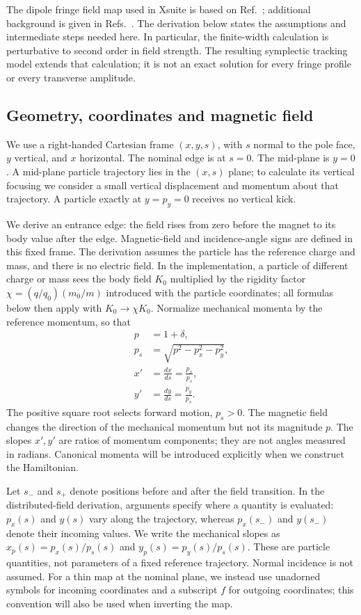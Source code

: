 The dipole fringe field map used in Xsuite is based on
Ref.~\cite{forest-fringe-1}; additional background is given in
Refs.~\cite{silke_cap, silke_fringe}. The derivation below states the
assumptions and intermediate steps needed here. In particular, the
finite-width calculation is perturbative to second order in field strength.
The resulting symplectic tracking model extends that calculation; it is not
an exact solution for every fringe profile or every transverse amplitude.

\subsection{Geometry, coordinates and magnetic field}

We use a right-handed Cartesian frame $(x,y,s)$, with $s$ normal to the pole
face, $y$ vertical, and $x$ horizontal. The nominal edge is at $s=0$.
The mid-plane is $y=0$. A mid-plane particle trajectory lies in the
$(x,s)$ plane; to calculate its vertical focusing we consider a small
vertical displacement and momentum about that trajectory. A particle exactly
at $y=p_y=0$ receives no vertical kick.

We derive an entrance edge: the field rises from zero before the magnet
to its body value after the edge. Magnetic-field and incidence-angle signs
are defined in this fixed frame. The derivation assumes the particle has
the reference charge and mass, and there is no electric field. In the
implementation, a particle of different charge or mass sees the body field
$K_0$ multiplied by the rigidity factor $\chi=(q/q_0)(m_0/m)$ introduced
with the particle coordinates; all formulas below then apply with
$K_0\to\chi K_0$. Normalize mechanical
momenta by the reference momentum, so that
\begin{align}
 p&=1+\delta,\label{eq:fringe_coordinates}\\
 p_s&=\sqrt{p^2-p_x^2-p_y^2},\\
 x'&=\frac{dx}{ds}=\frac{p_x}{p_s},\\
 y'&=\frac{dy}{ds}=\frac{p_y}{p_s}.
\end{align}
The positive square root selects forward motion, $p_s>0$. The magnetic
field changes the direction of the mechanical momentum but not its
magnitude $p$. The slopes $x',y'$ are ratios of momentum components; they
are not angles measured in radians. Canonical momenta will be introduced
explicitly when we construct the Hamiltonian.

Let $s_-$ and $s_+$ denote positions before and after the field transition.
In the distributed-field derivation, arguments specify where a quantity is
evaluated: $p_x(s)$ and $y(s)$ vary along the trajectory, whereas
$p_x(s_-)$ and $y(s_-)$ denote their incoming values. We write the
mechanical slopes as $x_p(s)=p_x(s)/p_s(s)$ and
$y_p(s)=p_y(s)/p_s(s)$. These are particle quantities, not parameters of
a fixed reference trajectory. Normal incidence is not assumed.
For a thin map at the nominal plane, we instead use unadorned symbols
for incoming coordinates and a subscript $f$ for outgoing coordinates;
this convention will also be used when inverting the map.

